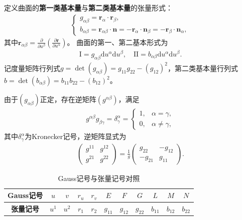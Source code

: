 \documentclass[../../main.tex]{subfiles}%
\begin{document}
\begin{definition}
定义曲面的\textbf{第一类基本量}与\textbf{第二类基本量}的张量形式：
\begin{align}
\begin{cases}
g_{\alpha\beta}=\boldsymbol{r}_\alpha\cdot\boldsymbol{r}_\beta,\\
b_{\alpha\beta}=\boldsymbol{r}_{\alpha\beta}\cdot\boldsymbol{n}=-\boldsymbol{r}_\alpha\cdot\boldsymbol{n}_\beta=-\boldsymbol{r}_\beta\cdot\boldsymbol{n}_\alpha,
\end{cases}\label{eq:fundamental_tensor}
\end{align}
其中$\boldsymbol{r}_{\alpha\beta}=\frac{\partial}{\partial u^\beta}\left(\frac{\partial \boldsymbol{r}}{\partial u^\alpha}\right)$。
曲面的第一、第二基本形式为
\begin{align}
\mathrm{I}=g_{\alpha\beta}\mathrm{d}u^\alpha\mathrm{d}u^\beta,\quad \mathrm{II}=b_{\alpha\beta}\mathrm{d}u^\alpha\mathrm{d}u^\beta.\label{eq:form_tensor}
\end{align}
记度量矩阵行列式$g=\det(g_{\alpha\beta})=g_{11}g_{22}-(g_{12})^2$，第二类基本量行列式$b=\det(b_{\alpha\beta})=b_{11}b_{22}-(b_{12})^2$。

由于$(g_{\alpha\beta})$正定，存在逆矩阵$(g^{\alpha\beta})$，满足
\begin{align}
g^{\alpha\beta}g_{\beta\gamma}=\delta^\alpha_\gamma=
\begin{cases}
1,&\alpha=\gamma,\\
0,&\alpha\neq\gamma,
\end{cases}\label{eq:metric_inverse}
\end{align}
其中$\delta^\alpha_\gamma$为Kronecker记号，逆矩阵显式为
\begin{align}
\begin{pmatrix}
g^{11}&g^{12}\\
g^{21}&g^{22}
\end{pmatrix}
=\frac{1}{g}\begin{pmatrix}
g_{22}&-g_{12}\\
-g_{21}&g_{11}
\end{pmatrix}.\label{eq:metric_inv_form}
\end{align}
\end{definition}

\begin{table}[H]
\centering
\caption{Gauss记号与张量记号对照}
\label{tab:gauss_tensor}
\begin{tabular}{*{11}{c}}
\toprule
\textbf{Gauss记号} & $u$ & $v$ & $r_u$ & $r_v$ & $E$ & $F$ & $G$ & $L$ & $M$ & $N$ \\
\midrule
\textbf{张量记号} & $u^1$ & $u^2$ & $r_1$ & $r_2$ & $g_{11}$ & $g_{12}$ & $g_{22}$ & $b_{11}$ & $b_{12}$ & $b_{22}$ \\
\bottomrule
\end{tabular}
\end{table}
\end{document}
